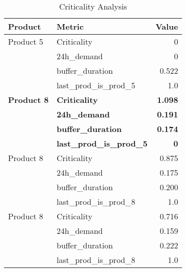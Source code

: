 \begin{table}[ht!]
    \footnotesize
    \centering
    \caption{Criticality Analysis}
    \label{tab:criticality_analysis}
    \begin{tabularx}{\textwidth}{lXr}
        \toprule
        \textbf{Product}   & \textbf{Metric}                  & \textbf{Value} \\
        \midrule
        Product 5          & Criticality                      & 0              \\
                           & 24h\_demand                      & 0              \\
                           & buffer\_duration                 & 0.522          \\
                           & last\_prod\_is\_prod\_5          & 1.0            \\
        \midrule
        \textbf{Product 8} & \textbf{Criticality}             & \textbf{1.098} \\
                           & \textbf{24h\_demand}             & \textbf{0.191} \\
                           & \textbf{buffer\_duration}        & \textbf{0.174} \\
                           & \textbf{last\_prod\_is\_prod\_5} & \textbf{0}     \\
        \midrule
        Product 8          & Criticality                      & 0.875          \\
                           & 24h\_demand                      & 0.175          \\
                           & buffer\_duration                 & 0.200          \\
                           & last\_prod\_is\_prod\_8          & 1.0            \\
        \midrule
        Product 8          & Criticality                      & 0.716          \\
                           & 24h\_demand                      & 0.159          \\
                           & buffer\_duration                 & 0.222          \\
                           & last\_prod\_is\_prod\_8          & 1.0            \\

        \bottomrule
    \end{tabularx}
\end{table}
\FloatBarrier


